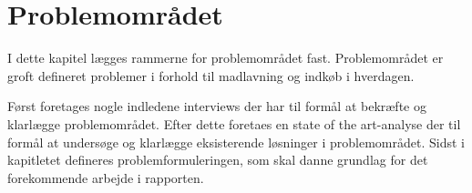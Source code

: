 \chapter{Problemområdet}\label{chapter:problemområde}
I dette kapitel lægges rammerne for problemområdet fast.
Problemområdet er groft defineret problemer i forhold til madlavning og indkøb i hverdagen.

Først foretages nogle indledene interviews der har til formål at bekræfte og klarlægge problemområdet.
Efter dette foretaes en state of the art-analyse der til formål at undersøge og klarlægge eksisterende løsninger i problemområdet.
Sidst i kapitletet defineres problemformuleringen, som skal danne grundlag for det forekommende arbejde i rapporten.




